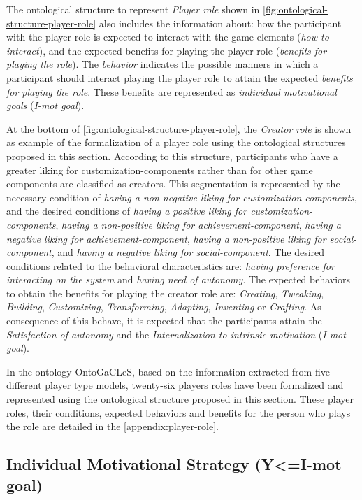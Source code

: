 The ontological structure to represent \emph{Player role} shown in \autoref{fig:ontological-structure-player-role} also includes the information about: how the participant with the player role is expected to interact with the game elements (\emph{how to interact}), and the expected benefits for playing the player role (\emph{benefits for playing the role}). The \emph{behavior} indicates the possible manners in which a participant should interact playing the player role to attain the expected \emph{benefits for playing the role}. These benefits are represented as \emph{individual motivational goals} (\emph{I-mot goal}).

At the bottom of \autoref{fig:ontological-structure-player-role}, the \emph{Creator role} is shown as example of the formalization of a player role using the ontological structures proposed in this section. According to this structure, participants who have a greater liking for customization-components rather than for other game components are classified as creators. This segmentation is represented by the necessary condition of \emph{having a non-negative liking for customization-components}, and the desired conditions of \emph{having a positive liking for customization-components}, \emph{having a non-positive liking for achievement-component}, \emph{having a negative liking for achievement-component}, \emph{having a non-positive liking for social-component}, and \emph{having a negative liking for social-component}. The desired conditions related to the behavioral characteristics are: \emph{having preference for interacting on the system} and \emph{having need of autonomy}. The expected behaviors to obtain the benefits for playing the creator role are: \emph{Creating}, \emph{Tweaking}, \emph{Building}, \emph{Customizing}, \emph{Transforming}, \emph{Adapting}, \emph{Inventing} or \emph{Crafting}. As consequence of this behave, it is expected that the participants attain the \emph{Satisfaction of autonomy} and the \emph{Internalization to intrinsic motivation} (\emph{I-mot goal}).

In the ontology OntoGaCLeS, based on the information extracted from five different player type models, twenty-six players roles have been formalized and represented using the ontological structure proposed in this section. These player roles, their conditions, expected behaviors and benefits for the person who plays the role are detailed in the \autoref{appendix:player-role}.

\subsection{Individual Motivational Strategy (Y<=I-mot goal)}

